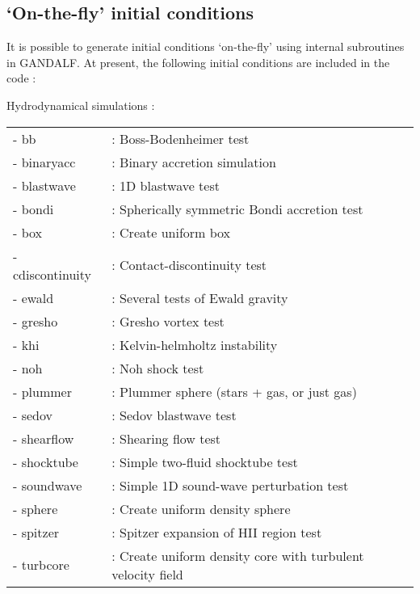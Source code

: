 \documentclass[a4paper]{article}
\begin{document}
\subsection{`On-the-fly' initial conditions}

It is possible to generate initial conditions `on-the-fly' using internal subroutines in GANDALF.  At present, the following initial conditions are included in the code : \newline

\noindent Hydrodynamical simulations : \\
\newline
\begin{tabular}{ll}
- bb             &: Boss-Bodenheimer test \\
- binaryacc      &: Binary accretion simulation \\
- blastwave      &: 1D blastwave test \\
- bondi          &: Spherically symmetric Bondi accretion test \\
- box            &: Create uniform box \\
- cdiscontinuity &: Contact-discontinuity test \\
- ewald          &: Several tests of Ewald gravity \\
- gresho         &: Gresho vortex test \\
- khi            &: Kelvin-helmholtz instability \\
- noh            &: Noh shock test \\
- plummer        &: Plummer sphere (stars + gas, or just gas) \\
- sedov          &: Sedov blastwave test \\
- shearflow      &: Shearing flow test \\
- shocktube      &: Simple two-fluid shocktube test \\
- soundwave      &: Simple 1D sound-wave perturbation test \\
- sphere         &: Create uniform density sphere \\
- spitzer        &: Spitzer expansion of HII region test \\
- turbcore       &: Create uniform density core with turbulent velocity field
\end{tabular}
\newline
\newline
\end{document}
